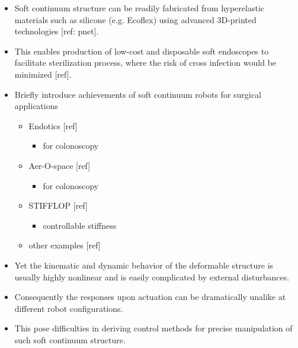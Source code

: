 \documentclass[journal,onecolumn]{IEEEtran}
\begin{document}
\begin{itemize}
\begin{itemize}
\item Soft continuum structure can be readily fabricated from hyperelastic materials such as silicone (e.g. Ecoflex) using advanced 3D-printed technologies [ref: pnet].
\item This enables production of low-cost and disposable soft endoscopes to facilitate sterilization process, where the risk of cross infection would be minimized [ref].
\item Briefly introduce achievements of soft continuum robots for surgical applications
\begin{itemize}
\item Endotics [ref]
\begin{itemize}
\item for colonoscopy
\end{itemize}
\item Aer-O-space [ref]
\begin{itemize}
\item for colonoscopy
\end{itemize}
\item STIFFLOP [ref]
\begin{itemize}
\item controllable stiffness
\end{itemize}
\item other examples [ref]
\end{itemize}

\item Yet the kinematic and dynamic behavior of the deformable structure is usually highly nonlinear and is easily complicated by external disturbances.
\item Consequently the responses upon actuation can be dramatically unalike at different robot configurations.
\item This pose difficulties in deriving control methods for precise manipulation of such soft continuum structure.
\end{itemize}
\end{itemize}
\end{document}
